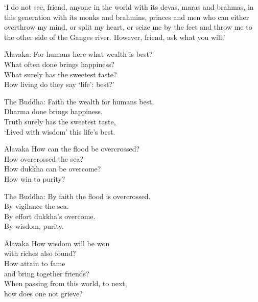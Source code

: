 `I do not see, friend, anyone in the world with its devas, maras and brahmas, in this generation with its monks and brahmins, princes and men who can either overthrow my mind, or split my heart, or seize me by the feet and throw me to the other side of the Ganges river. However, friend, ask what you will.'


\begin{MyDescription}{\=Alavaka:}
For humans here what wealth is best?\\
What often done brings happiness?\\
What surely has the sweetest taste?\\
How living do they say `life': best?'
\end{MyDescription}  								


\begin{MyDescription}{The Buddha:}
Faith the wealth for humans best,\\
Dharma done brings happiness,\\
Truth surely has the sweetest taste,\\
`Lived with wisdom' this life's best.
\end{MyDescription}    

\begin{MyDescription}{\=Alavaka}
How can the ﬂood be overcrossed?\\
How overcrossed the sea?\\
How dukkha can be overcome?\\
How win to purity?
\end{MyDescription}    

\begin{MyDescription}{The Buddha:}
By faith the ﬂood is overcrossed.\\
By vigilance the sea.\\
By effort dukkha's overcome.\\
By wisdom, purity.
\end{MyDescription}    

\begin{MyDescription}{\=Alavaka}
How wisdom will be won\\
with riches also found?\\
How attain to fame\\
and bring together friends?\\
When passing from this world, to next,\\
how does one not grieve?
\end{MyDescription}    

